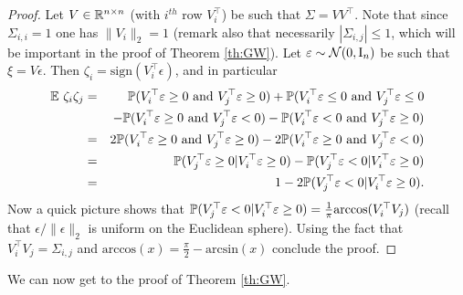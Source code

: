 \begin{proof}
Let $V \in \R^{n \times n}$ (with $i^{th}$ row $V_i^{\top}$) be such that $\Sigma = V V^{\top}$. Note that since $\Sigma_{i,i}=1$ one has $\|V_i\|_2 = 1$ (remark also that necessarily $|\Sigma_{i,j}| \leq 1$, which will be important in the proof of Theorem \ref{th:GW}). Let $\epsilon \sim \mathcal{N}(0,\mI_n)$ be such that $\xi = V \epsilon$. Then $\zeta_i = \mathrm{sign}(V_i^{\top} \epsilon)$, and in particular
\begin{eqnarray*}
\E \ \zeta_i \zeta_j & = & \P(V_i^{\top} \epsilon \geq 0 \ \text{and} \ V_j^{\top} \epsilon \geq 0) + \P(V_i^{\top} \epsilon \leq 0 \ \text{and} \ V_j^{\top} \epsilon \leq 0 \\
& & - \P(V_i^{\top} \epsilon \geq 0 \ \text{and} \ V_j^{\top} \epsilon < 0) - \P(V_i^{\top} \epsilon < 0 \ \text{and} \ V_j^{\top} \epsilon \geq 0) \\
& = & 2 \P(V_i^{\top} \epsilon \geq 0 \ \text{and} \ V_j^{\top} \epsilon \geq 0) - 2 \P(V_i^{\top} \epsilon \geq 0 \ \text{and} \ V_j^{\top} \epsilon < 0) \\
& = & \P(V_j^{\top} \epsilon \geq 0 | V_i^{\top} \epsilon \geq 0) - \P(V_j^{\top} \epsilon < 0 | V_i^{\top} \epsilon \geq 0) \\
& = & 1 - 2 \P(V_j^{\top} \epsilon < 0 | V_i^{\top} \epsilon \geq 0).
\end{eqnarray*}
Now a quick picture shows that $\P(V_j^{\top} \epsilon < 0 | V_i^{\top} \epsilon \geq 0) = \frac{1}{\pi} \mathrm{arccos}(V_i^{\top} V_j)$ (recall that $\epsilon / \|\epsilon\|_2$ is uniform on the Euclidean sphere). Using the fact that $V_i^{\top} V_j = \Sigma_{i,j}$ and $\mathrm{arccos}(x) = \frac{\pi}{2} - \mathrm{arcsin}(x)$ conclude the proof.
\end{proof}

We can now get to the proof of Theorem \ref{th:GW}.

